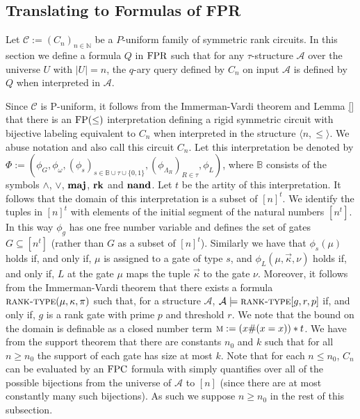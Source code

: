 \documentclass[../paper.tex]{subfiles}
\begin{document}

\subsection{Translating to Formulas of FPR}
\label{sec:translating-formulas-to-FPR}
Let $\mathcal{C}:= (C_n)_{n \in \mathbb{N}}$ be a $P$-uniform family of
symmetric rank circuits. In this section we define a formula $Q$ in $\text{\upshape FPR}$ such
that for any $\tau$-structure $\mathcal{A}$ over the universe $U$ with $\vert U
\vert = n$, the $q$-ary query defined by $C_n$ on input $\mathcal{A}$ is defined
by $Q$ when interpreted in $\mathcal{A}$.

Since $\mathcal{C}$ is P-uniform, it follows from the Immerman-Vardi theorem and
Lemma \ref{} that there is an $\text{\upshape FP}(\leq)$ interpretation defining a rigid
symmetric circuit with bijective labeling equivalent to $C_n$ when interpreted
in the structure $\langle n, \leq \rangle$. We abuse notation and also call this
circuit $C_n$. Let this interpretation be denoted by $\Phi := (\phi_G,
\phi_\omega, (\phi_s)_{ s \in \mathbb{B} \cup \tau \cup \{0,1\}},
(\phi_{\Lambda_R})_{R \in \tau}, \phi_L)$, where $\mathbb{B}$ consists of the
symbols $\land$, $\lor$, $\text{\textbf{maj}}$, $\text{\textbf{rk}}$ and $\text{\textbf{nand}}$. Let $t$ be the artity of
this interpretation. It follows that the domain of this interpretation is a
subset of $[n]^t$. We identify the tuples in $[n]^t$ with elements of the
initial segment of the natural numbers $[n^t]$. In this way $\phi_g$ has one
free number variable and defines the set of gates $G \subseteq [n^t]$ (rather
than $G$ as a subset of $[n]^t$). Similarly we have that $\phi_s (\mu)$ holds
if, and only if, $\mu$ is assigned to a gate of type $s$, and $\phi_L (\mu,
\vec{\kappa}, \nu)$ holds if, and only if, $L$ at the gate $\mu$ maps the tuple
$\vec{\kappa}$ to the gate $\nu$. Moreover, it follows from the Immerman-Vardi
theorem that there exists a formula $\textsc{rank-type}(\mu, \kappa , \pi)$ such
that, for a structure $\mathcal{A}$, $\mathcal{A} \models \textsc{rank-type}[g, r,
p]$ if, and only if, $g$ is a rank gate with prime $p$ and threshold $r$. We
note that the bound on the domain is definable as a closed number term $\textsc{m}
:= (x\# (x = x))*t$. We have from the support theorem that there are constants
$n_0$ and $k$ such that for all $n \geq n_0$ the support of each gate has size
at most $k$. Note that for each $n \leq n_0$, $C_n$ can be evaluated by an
$\text{\upshape FPC}$ formula with simply quantifies over all of the possible bijections from
the universe of $\mathcal{A}$ to $[n]$ (since there are at most constantly many
such bijections). As such we suppose $n \geq n_0$ in the rest of this
subsection.
\end{document}
